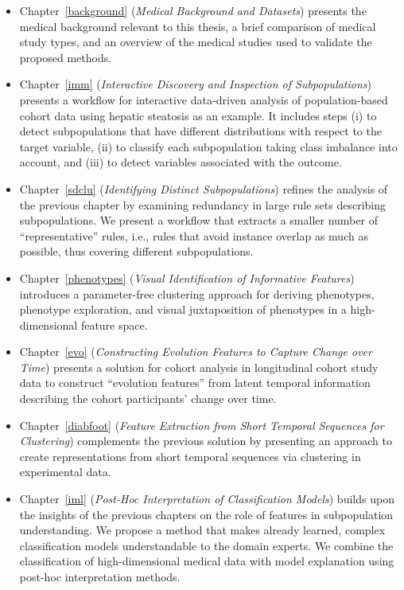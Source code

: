 \documentclass[
  oneside]{book}
\providecommand{\tightlist}{%
  \setlength{\itemsep}{0pt}\setlength{\parskip}{0pt}}
\begin{document}
\begin{itemize}
\tightlist
\item
  Chapter~\ref{background} (\emph{Medical Background and Datasets}) presents the medical background relevant to this thesis, a brief comparison of medical study types, and an overview of the medical studies used to validate the proposed methods.
\item
  Chapter~\ref{imm} (\emph{Interactive Discovery and Inspection of Subpopulations}) presents a workflow for interactive data-driven analysis of population-based cohort data using hepatic steatosis as an example. It includes steps (i) to detect subpopulations that have different distributions with respect to the target variable, (ii) to classify each subpopulation taking class imbalance into account, and (iii) to detect variables associated with the outcome.
\item
  Chapter~\ref{sdclu} (\emph{Identifying Distinct Subpopulations}) refines the analysis of the previous chapter by examining redundancy in large rule sets describing subpopulations. We present a workflow that extracts a smaller number of ``representative'' rules, i.e., rules that avoid instance overlap as much as possible, thus covering different subpopulations.
\item
  Chapter~\ref{phenotypes} (\emph{Visual Identification of Informative Features}) introduces a parameter-free clustering approach for deriving phenotypes, phenotype exploration, and visual juxtaposition of phenotypes in a high-dimensional feature space.
\item
  Chapter~\ref{evo} (\emph{Constructing Evolution Features to Capture Change over Time}) presents a solution for cohort analysis in longitudinal cohort study data to construct ``evolution features'' from latent temporal information describing the cohort participants' change over time.
\item
  Chapter~\ref{diabfoot} (\emph{Feature Extraction from Short Temporal Sequences for Clustering}) complements the previous solution by presenting an approach to create representations from short temporal sequences via clustering in experimental data.
\item
  Chapter~\ref{iml} (\emph{Post-Hoc Interpretation of Classification Models}) builds upon the insights of the previous chapters on the role of features in subpopulation understanding. We propose a method that makes already learned, complex classification models understandable to the domain experts. We combine the classification of high-dimensional medical data with model explanation using post-hoc interpretation methods.

\end{itemize}
\end{document}
